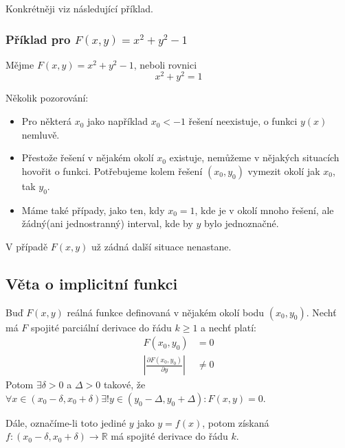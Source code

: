 \documentclass[10pt]{article}
\begin{document}
\vspace{5mm}
\noindent
\hspace{1.2mm}
Konkrétněji viz následující příklad.

\subsubsection{Příklad pro $F(x,y) = x^2 + y^2 - 1$}
\noindent
\hspace{1.2mm}
Mějme $F(x,y) = x^2 + y^2 - 1$, neboli rovnici \[ x^2 + y^2 = 1 \]

\noindent
\hspace{1.2mm}
Několik pozorování:
\begin{itemize}
    \item Pro některá $x_0$ jako například $x_0 < -1$ řešení neexistuje, o funkci $y(x)$ nemluvě.
    \item Přestože řešení v nějakém okolí $x_0$ existuje, nemůžeme v nějakých situacích hovořit o funkci.
    Potřebujeme kolem řešení $(x_0, y_0)$ vymezit okolí jak $x_0$, tak $y_0$.
    \item Máme také případy, jako ten, kdy $x_0 = 1$, kde je v okolí mnoho řešení, ale žádný(ani
    jednostranný) interval, kde by $y$ bylo jednoznačné.
\end{itemize}

\noindent
\hspace{1.2mm}
V případě $F(x,y)$ už zádná další situace nenastane.

\subsection{Věta o implicitní funkci}
\hspace{1.2mm}
\noindent
Buď $F(x,y)$ reálná funkce definovaná v nějakém okolí bodu $(x_0, y_0)$. Nechť má $F$ spojité parciální
derivace do řádu $k \geq 1$ a nechť platí:
\begin{align*}
    F(x_0, y_0) &= 0\\
    \left| \frac{\partial F(x_0,y_0)}{\partial y} \right| &\neq 0
\end{align*}
Potom $ \exists \delta > 0$ a $\Delta > 0$ takové, že
$\forall x \in (x_0 - \delta , x_0 + \delta) \exists! y \in (y_0 - \Delta , y_0 + \Delta): F(x,y) = 0$.

\noindent
Dále, označíme-li toto jediné $y$ jako $y = f(x)$, potom získaná
$f: (x_0 - \delta , x_0 + \delta ) \to \mathbb{R}$ má spojité derivace do řádu $k$.
\end{document}
